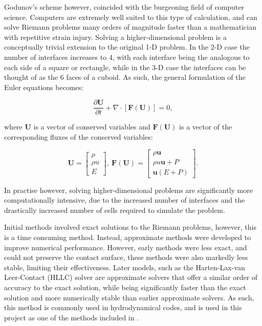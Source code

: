 Godunov's scheme however, coincided with the burgeoning field of computer science.
Computers are extremely well suited to this type of calculation, and can solve Riemann problems many orders of magnitude faster than a mathematician with repetitive strain injury.
Solving a higher-dimensional problem is a conceptually trivial extension to the original 1-D problem.
In the 2-D case the number of interfaces increases to 4, with each interface being the analogous to each side of a square or rectangle, while in the 3-D case the interfaces can be thought of as the 6 faces of a cuboid.
As such, the general formulation of the Euler equations becomes:

\begin{equation}
  \frac{\partial \mathbf{U}}{\partial t} + \nabla \cdot \left[ \mathbf{F}(\mathbf{U}) \right] = 0 ,
\end{equation}

\noindent
where $\mathbf{U}$ is a vector of conserved variables and $\mathbf{F}(\mathbf{U})$ is a vector of the corresponding fluxes of the conserved variables:

\begin{equation}
  \mathbf{U} = 
  \begin{bmatrix}
    \rho \\
    \rho u \\
    E
  \end{bmatrix}
  , ~
  \mathbf{F}(\mathbf{U}) =
  \begin{bmatrix}
    \rho \boldsymbol{u} \\
    \rho u \boldsymbol{u} + P \\
    \boldsymbol{u}(E + P)
  \end{bmatrix} .
\end{equation}

In practise however, solving higher-dimensional problems are significantly more computationally intensive, due to the increased number of interfaces and the drastically increased number of cells required to simulate the problem.


Initial methods involved exact solutions to the Riemann problems, however, this is a time consuming method.
Instead, approximate methods were developed to improve numerical performance.
However, early methods were less exact, and could not preserve the contact surface, these methods were also markedly less stable, limiting their effectiveness.
Later models, such as the Harten-Lax-van Leer-Contact (HLLC) solver \parencite{toroRestorationContactSurface1994} are approximate solvers that offer a similar order of accuracy to the exact solution, while being significantly faster than the exact solution and more numerically stable than earlier approximate solvers.
As such, this method is commonly used in hydrodynamical codes, and is used in this project as one of the methods included in \athena.

